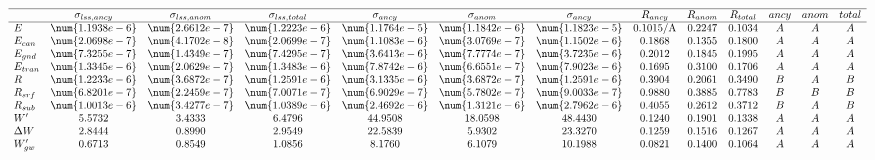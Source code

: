 \[
  \begin{array}{lcccccccccccc}
    \hline
    & \sigma_{lss,ancy} & \sigma_{lss,anom} & \sigma_{lss,total} & \sigma_{ancy}   & \sigma_{anom}   & \sigma_{ancy}   & R_{ancy} & R_{anom} & R_{total} & ancy & anom & total \\
    \hline
    E             & \num{1.1938e-6}   & \num{2.6612e-7}   & \num{1.2223e-6}    & \num{1.1764e-5} & \num{1.1842e-6} & \num{1.1823e-5} & 0.1015/\text{A}  & 0.2247   & 0.1034    & A    & A    & A     \\
    E_{can}       & \num{2.0698e-7}   & \num{4.1702e-8}   & \num{2.0699e-7}    & \num{1.1083e-6} & \num{3.0769e-7} & \num{1.1502e-6} & 0.1868   & 0.1355   & 0.1800    & A    & A    & A     \\
    E_{gnd}       & \num{7.3255e-7}   & \num{1.4349e-7}   & \num{7.4295e-7}    & \num{3.6413e-6} & \num{7.7774e-7} & \num{3.7235e-6} & 0.2012   & 0.1845   & 0.1995    & A    & A    & A     \\
    E_{tran}      & \num{1.3345e-6}   & \num{2.0629e-7}   & \num{1.3483e-6}    & \num{7.8742e-6} & \num{6.6551e-7} & \num{7.9023e-6} & 0.1695   & 0.3100   & 0.1706    & A    & A    & A     \\
    R             & \num{1.2233e-6}   & \num{3.6872e-7}   & \num{1.2591e-6}    & \num{3.1335e-6} & \num{3.6872e-7} & \num{1.2591e-6} & 0.3904   & 0.2061   & 0.3490    & B    & A    & B     \\
    R_{srf}       & \num{6.8201e-7}   & \num{2.2459e-7}   & \num{7.0071e-7}    & \num{6.9029e-7} & \num{5.7802e-7} & \num{9.0033e-7} & 0.9880   & 0.3885   & 0.7783    & B    & B    & B     \\
    R_{sub}       & \num{1.0013e-6}   & \num{3.4277e-7}   & \num{1.0389e-6}    & \num{2.4692e-6} & \num{1.3121e-6} & \num{2.7962e-6} & 0.4055   & 0.2612   & 0.3712    & B    & A    & B     \\
    W'            & 5.5732            & 3.4333            & 6.4796             & 44.9508         & 18.0598         & 48.4430         & 0.1240   & 0.1901   & 0.1338    & A    & A    & A     \\
    \Delta W      & 2.8444            & 0.8990            & 2.9549             & 22.5839         & 5.9302          & 23.3270         & 0.1259   & 0.1516   & 0.1267    & A    & A    & A     \\
    W'_{gw}       & 0.6713            & 0.8549            & 1.0856             & 8.1760          & 6.1079          & 10.1988         & 0.0821   & 0.1400   & 0.1064    & A    & A    & A     \\

\end{array}\]
